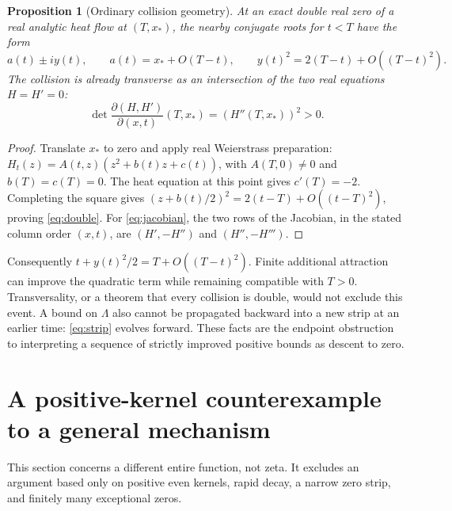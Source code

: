 \documentclass[11pt]{article}
\numberwithin{equation}{section}
\newtheorem{proposition}[theorem]{Proposition}
\theoremstyle{definition}
\theoremstyle{remark}
\begin{document}
\begin{proposition}[Ordinary collision geometry]\label{prop:double}
At an exact double real zero of a real analytic heat flow at $(T,x_*)$,
the nearby conjugate roots for $t<T$ have the form
\begin{equation}\label{eq:double}
 a(t)\pm iy(t),\qquad a(t)=x_*+O(T-t),\qquad
 y(t)^2=2(T-t)+O((T-t)^2).
\end{equation}
The collision is already transverse as an intersection of the two real
equations $H=H'=0$:
\begin{equation}\label{eq:jacobian}
 \det\frac{\partial(H,H')}{\partial(x,t)}(T,x_*)=(H''(T,x_*))^2>0.
\end{equation}
\end{proposition}
\begin{proof}
Translate $x_*$ to zero and apply real Weierstrass preparation:
$H_t(z)=A(t,z)(z^2+b(t)z+c(t))$, with $A(T,0)\ne0$ and
$b(T)=c(T)=0$. The heat equation at this point gives $c'(T)=-2$.
Completing the square gives
$(z+b(t)/2)^2=2(t-T)+O((t-T)^2)$, proving \eqref{eq:double}.
For \eqref{eq:jacobian}, the two rows of the Jacobian, in the stated
column order $(x,t)$, are $(H',-H'')$ and $(H'',-H''')$.
\end{proof}

Consequently $t+y(t)^2/2=T+O((T-t)^2)$. Finite additional attraction
can improve the quadratic term while remaining compatible with $T>0$.
Transversality, or a theorem that every collision is double, would not
exclude this event. A bound on $\Lambda$ also cannot be propagated
backward into a new strip at an earlier time: \eqref{eq:strip} evolves
forward. These facts are the endpoint obstruction to interpreting a
sequence of strictly improved positive bounds as descent to zero.

\section{A positive-kernel counterexample to a general mechanism}
\label{sec:counterexample}
This section concerns a different entire function, not zeta. It excludes
an argument based only on positive even kernels, rapid decay, a narrow
zero strip, and finitely many exceptional zeros.
\end{document}

